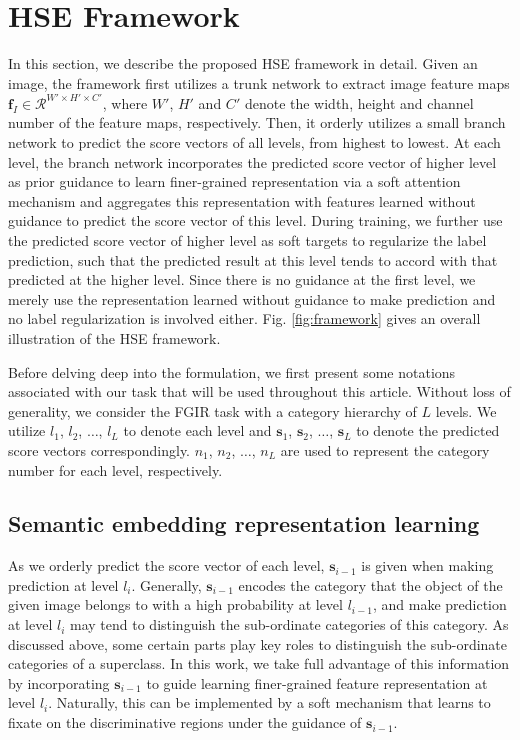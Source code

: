 \documentclass[sigconf]{acmart}
\begin{document}
\section{HSE Framework}

In this section, we describe the proposed HSE framework in detail. Given an image, the framework first utilizes a trunk network to extract image feature maps $\mathbf{f}_I \in \mathcal{R}^{W' \times H' \times C'}$, where $W'$, $H'$ and $C'$ denote the width, height and channel number of the feature maps, respectively. Then, it orderly utilizes a small branch network to predict the score vectors of all levels, from highest to lowest. At each level, the branch network incorporates the predicted score vector of higher level as prior guidance to learn finer-grained representation via a soft attention mechanism and aggregates this representation with features learned without guidance to predict the score vector of this level. During training, we further use the predicted score vector of higher level as soft targets to regularize the label prediction, such that the predicted result at this level tends to accord with that predicted at the higher level. Since there is no guidance at the first level, we merely use the representation learned without guidance to make prediction and no label regularization is involved either. Fig. \ref{fig:framework} gives an overall illustration of the HSE framework.


Before delving deep into the formulation, we first present some notations associated with our task that will be used throughout this article. Without loss of generality, we consider the FGIR task with a category hierarchy of $L$ levels. We utilize $l_1$, $l_2$, $\dots$, $l_L$ to denote each level and $\mathbf{s}_{1}$, $\mathbf{s}_{2}$, $\dots$, $\mathbf{s}_{L}$ to denote the predicted score vectors correspondingly. $n_1$, $n_2$, $\dots$, $n_L$ are used to represent the category number for each level, respectively.


\subsection{Semantic embedding representation learning}
As we orderly predict the score vector of each level, $\mathbf{s}_{i-1}$ is given when making prediction at level $l_i$. Generally, $\mathbf{s}_{i-1}$ encodes the category that the object of the given image belongs to with a high probability at level $l_{i-1}$, and make prediction at level $l_i$ may tend to distinguish the sub-ordinate categories of this category. As discussed above, some certain parts play key roles to distinguish the sub-ordinate categories of a superclass. In this work, we take full advantage of this information by incorporating $\mathbf{s}_{i-1}$ to guide learning finer-grained feature representation at level $l_i$. Naturally, this can be implemented by a soft mechanism that learns to fixate on the discriminative regions under the guidance of $\mathbf{s}_{i-1}$.
\end{document}
